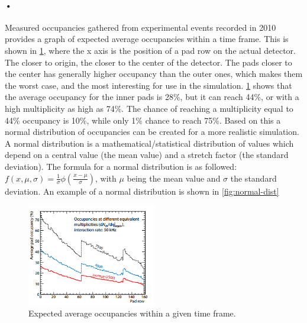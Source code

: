 \documentclass[a4paper, 12pt]{report}
\begin{document}
\paragraph{•}
Measured occupancies gathered from experimental events recorded in 2010 provides a graph of expected average occupancies within a time frame.
This is shown in \ref{fig:expected-occupancy}, where the x axis is the position of a pad row on the actual detector.
The closer to origin, the closer to the center of the detector.
The pads closer to the center has generally higher occupancy than the outer ones, which makes them the worst case, and the most interesting for use in the simulation.
\ref{fig:expected-occupancy} shows that the average occupancy for the inner pads is 28\%, but it can reach 44\%, or with a high multiplicity as high as 74\%.
The chance of reaching a multiplicity equal to 44\% occupancy is 10\%, while only 1\% chance to reach 75\%.
Based on this a normal distribution of occupancies can be created for a more realistic simulation.
A normal distribution is a mathematical/statistical distribution of values which depend on a central value (the mean value) and a stretch factor (the standard deviation)\cite{normal-dist}.
The formula for a normal distribution is as followed: $f(x,\mu,\sigma) = \frac{1}{\sigma}\phi(\frac{x-\mu}{\sigma})  $, with $ \mu$ being the mean value and $ \sigma$ the standard deviation. 
An example of a normal distribution is shown in \ref{fig:normal-dist}

\begin{figure}[h!]
	\centering
		\includegraphics[width=0.5\textwidth]{images/expected-occupancy.png}
		\caption[Expected average occupancies within a given time frame.]{Expected average occupancies within a given time frame. \cite{tdr-016}}
		\label{fig:expected-occupancy}
\end{figure}
\end{document}
